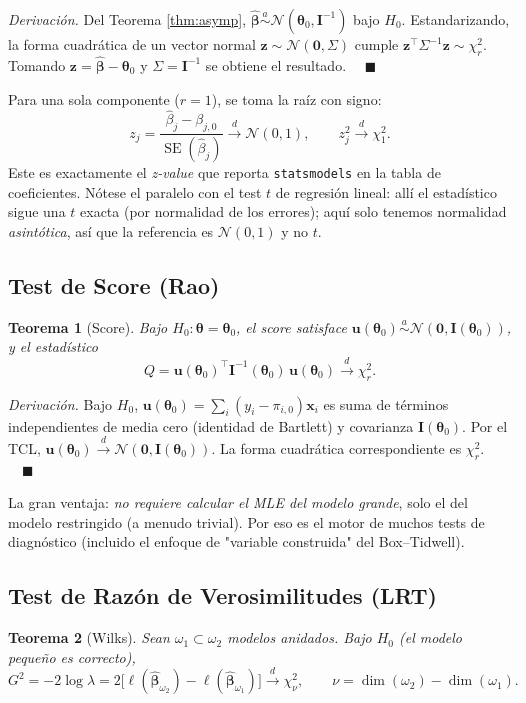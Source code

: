 \documentclass[11pt]{article}
\theoremstyle{plain}
\newtheorem{teorema}{Teorema}[section]
\theoremstyle{definition}
\theoremstyle{remark}
\newcommand{\bx}{\bm{x}}
\newcommand{\bu}{\bm{u}}
\newcommand{\bI}{\bm{I}}
\newcommand{\btheta}{\bm{\theta}}
\newcommand{\hbeta}{\hat{\bm{\beta}}}
\newcommand{\convd}{\xrightarrow{d}}
\newcommand{\Nor}{\mathcal{N}}
\begin{document}
\emph{Derivación.} Del Teorema \ref{thm:asymp}, $\hbeta \overset{a}{\sim}
\Nor(\btheta_0, \bI^{-1})$ bajo $H_0$. Estandarizando, la forma cuadrática de un
vector normal $\bm z\sim\Nor(\bm0,\Sigma)$ cumple $\bm z^\top\Sigma^{-1}\bm z
\sim\chi^2_r$. Tomando $\bm z=\hbeta-\btheta_0$ y $\Sigma=\bI^{-1}$ se obtiene
el resultado. $\quad\blacksquare$

Para una sola componente ($r=1$), se toma la raíz con signo:
\[
  z_j = \frac{\hat\beta_j - \beta_{j,0}}{\operatorname{SE}(\hat\beta_j)}
  \convd \Nor(0,1),
  \qquad z_j^2 \convd \chi^2_1.
\]
Este es exactamente el \emph{z-value} que reporta \texttt{statsmodels} en la
tabla de coeficientes. Nótese el paralelo con el test $t$ de regresión lineal:
allí el estadístico sigue una $t$ exacta (por normalidad de los errores); aquí
solo tenemos normalidad \emph{asintótica}, así que la referencia es $\Nor(0,1)$
y no $t$.

\subsection{Test de Score (Rao)}

\begin{teorema}[Score]
Bajo $H_0:\btheta=\btheta_0$, el score satisface
$\bu(\btheta_0)\overset{a}{\sim}\Nor(\bm0,\bI(\btheta_0))$, y el estadístico
\[
  Q = \bu(\btheta_0)^\top \bI^{-1}(\btheta_0)\, \bu(\btheta_0) \convd \chi^2_r.
\]
\end{teorema}

\emph{Derivación.} Bajo $H_0$, $\bu(\btheta_0)=\sum_i(y_i-\pi_{i,0})\bx_i$ es
suma de términos independientes de media cero (identidad de Bartlett) y
covarianza $\bI(\btheta_0)$. Por el TCL,
$\bu(\btheta_0)\convd\Nor(\bm0,\bI(\btheta_0))$. La forma cuadrática
correspondiente es $\chi^2_r$. $\quad\blacksquare$

La gran ventaja: \emph{no requiere calcular el MLE del modelo grande}, solo el
del modelo restringido (a menudo trivial). Por eso es el motor de muchos tests
de diagnóstico (incluido el enfoque de "variable construida" del Box--Tidwell).

\subsection{Test de Razón de Verosimilitudes (LRT)}

\begin{teorema}[Wilks]
Sean $\omega_1\subset\omega_2$ modelos anidados. Bajo $H_0$ (el modelo pequeño
es correcto),
\[
  G^2 = -2\log\lambda
  = 2\big[\ell(\hbeta_{\omega_2}) - \ell(\hbeta_{\omega_1})\big]
  \convd \chi^2_\nu,
  \qquad \nu = \dim(\omega_2)-\dim(\omega_1).
\]
\end{teorema}
\end{document}
